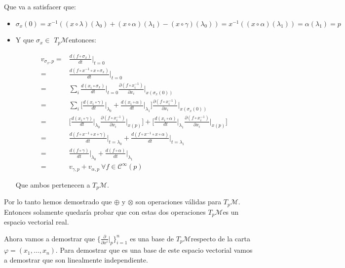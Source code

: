 \documentclass[pdftex,11pt,a4paper]{book}
\newcommand{\tpm}{$T_p\mathscr{M}$}
\begin{document}
Que va a satisfacer que:
\begin{itemize}
	\item $\sigma_x(0) =x^{-1}((x\circ \lambda)(\lambda_0 ) + (x \circ \alpha)(\lambda_1 ) - (x \circ \gamma)(\lambda_0)) = x^{-1}((x \circ \alpha)(\lambda_1 )) = \alpha(\lambda_1) = p $ 
	\item  	Y que $\sigma_x \in$ \tpm entonces: 


\begin{equation}
    \begin{aligned}
       v_{\sigma_x, p} =& \frac{d(f\circ \sigma_x)}{dt}\bigg|_{t=0} \\
       =& \frac{d(f\circ x^{-1} \circ x \circ \sigma_x)}{dt} \bigg|_{t=0} \\
       =& \sum_i \frac{d(x_i \circ \sigma_x)}{dt}\bigg|_{t=0} \frac{\partial(f \circ x_i^{-1})}{\partial x_i}\bigg|_{x(\sigma_x(0))}\\
       =&\sum_i \bigg[\frac{d(x_i \circ \gamma)}{dt}\bigg|_{\lambda_0} + \frac{d(x_i \circ \alpha)}{dt}\bigg|_{\lambda_1} \bigg] \frac{\partial(f \circ x_i^{-1})}{\partial x_i}\bigg|_{x(\sigma_x(0))}\\
       =& \bigg[ \frac{d(x_i \circ \gamma)}{dt}\bigg|_{\lambda_0} \frac{\partial(f \circ x_i^{-1})}{\partial x_i}\bigg|_{x(p)} \bigg] + \bigg[\frac{d(x_i \circ \alpha)}{dt}\bigg|_{\lambda_1}\frac{\partial(f \circ x_i^{-1})}{\partial x_i}\bigg|_{x(p)}\bigg] \\
       =& \frac{d(f \circ x^{-1} \circ x \circ \gamma )}{dt} \bigg|_{t=\lambda_0} + \frac{d(f \circ x^{-1} \circ x \circ \alpha)}{dt}\bigg|_{t=\lambda_1}\\
       =& \frac{d(f\circ \gamma)}{dt}\bigg|_{\lambda_0} + \frac{d(f \circ \alpha)}{dt}\bigg|_{\lambda_1}\\
       =& v_{\gamma,p} + v_{\alpha, p}\   \forall f \in \mathscr{C}^\infty(p)
    \end{aligned}
\end{equation}

 

	
Que ambos pertenecen a \tpm. 
\end{itemize}
 Por lo tanto hemos demostrado que $\oplus$ y $\otimes$ son operaciones válidas para \tpm . Entonces solamente quedaría probar que con estas dos operaciones \tpm es un espacio vectorial real. 


Ahora vamos a demostrar que  $\lbrace \frac{\partial}{\partial x^i}\bigg|_p \rbrace_{i = 1}^n$ es una base de \tpm respecto de la carta $\varphi = (x_1,\ldots, x_n)$. Para demostrar que es una base de este espacio vectorial vamos a demostrar que son linealmente independiente. 
\end{document}
